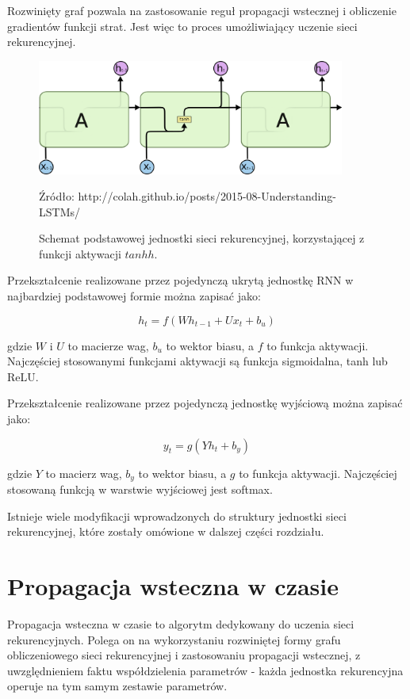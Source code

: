 \documentclass[oneside, mag]{mgr}
\begin{document}
Rozwinięty graf pozwala na zastosowanie reguł propagacji wstecznej i obliczenie gradientów funkcji strat. Jest więc to proces umożliwiający uczenie sieci rekurencyjnej.

\begin{figure}
\centering
	\includegraphics[width=0.9\textwidth]{img/LSTM3-SimpleRNN.png}
	\caption{Schemat podstawowej jednostki sieci rekurencyjnej, korzystającej z funkcji aktywacji $tanhh$.} Źródło: http://colah.github.io/posts/2015-08-Understanding-LSTMs/
	\label{fig:simple_rnn}
\end{figure}

Przekształcenie realizowane przez pojedynczą ukrytą jednostkę RNN w najbardziej podstawowej formie można zapisać jako:

\begin{equation}
	h_t = f(W h_{t-1} + U x_t + b_u)
\end{equation}

gdzie $W$ i $U$ to macierze wag, $b_u$ to wektor biasu, a $f$ to funkcja aktywacji. Najczęściej stosowanymi funkcjami aktywacji są funkcja sigmoidalna, tanh lub ReLU.

Przekształcenie realizowane przez pojedynczą jednostkę wyjściową można zapisać jako:

\begin{equation}
	y_t = g(Y h_t + b_y)
\end{equation}

gdzie $Y$ to macierz wag, $b_y$ to wektor biasu, a $g$ to funkcja aktywacji. Najczęściej stosowaną funkcją w warstwie wyjściowej jest softmax.

Istnieje wiele modyfikacji wprowadzonych do struktury jednostki sieci rekurencyjnej, które zostały omówione w dalszej części rozdziału.

\section{Propagacja wsteczna w czasie}

Propagacja wsteczna w czasie to algorytm dedykowany do uczenia sieci rekurencyjnych. Polega on na wykorzystaniu rozwiniętej formy grafu obliczeniowego sieci rekurencyjnej i zastosowaniu propagacji wstecznej, z uwzględnieniem faktu współdzielenia parametrów - każda jednostka rekurencyjna operuje na tym samym zestawie parametrów.
\end{document}
